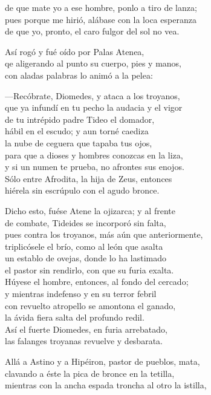 de que mate yo a ese hombre, ponlo a tiro de lanza;\\
pues porque me hirió, alábase con la loca esperanza\\
de que yo, pronto, el caro fulgor del sol no vea.\par
Así rogó y fué oído por Palas Atenea,\\
qe aligerando al punto su cuerpo, pies y manos,\\
con aladas palabras lo animó a la pelea:\par
---Recóbrate, Diomedes, y ataca a los troyanos,\\
que ya infundí en tu pecho la audacia y el vigor\\
de tu intrépido padre Tideo el domador,\\
hábil en el escudo; y aun torné caediza\\
la nube de ceguera que tapaba tus ojos,\\
para que a dioses y hombres conozcas en la liza,\\
y si un numen te prueba, no afrontes sus enojos.\\
Sólo entre Afrodita, la hija de Zeus, entonces\\
hiérela sin escrúpulo con el agudo bronce.\par
Dicho esto, fuése Atene la ojizarca; y al frente\\
de combate, Tideides se incorporó sin falta,\\
pues contra los troyanos, más aún que anteriormente,\\
triplicósele el brío, como al león que asalta\\
un establo de ovejas, donde lo ha lastimado\\
el pastor sin rendirlo, con que su furia exalta.\\
Húyese el hombre, entonces, al fondo del cercado;\\
y mientras indefenso y en su terror febril\\
con revuelto atropello se amontona el ganado,\\
la ávida fiera salta del profundo redil.\\
Así el fuerte Diomedes, en furia arrebatado,\\
las falanges troyanas revuelve y desbarata.\par
Allá a Astino y a Hipéiron, pastor de pueblos, mata,\\
clavando a éste la pica de bronce en la tetilla,\\
mientras con la ancha espada troncha al otro la istilla,\\
